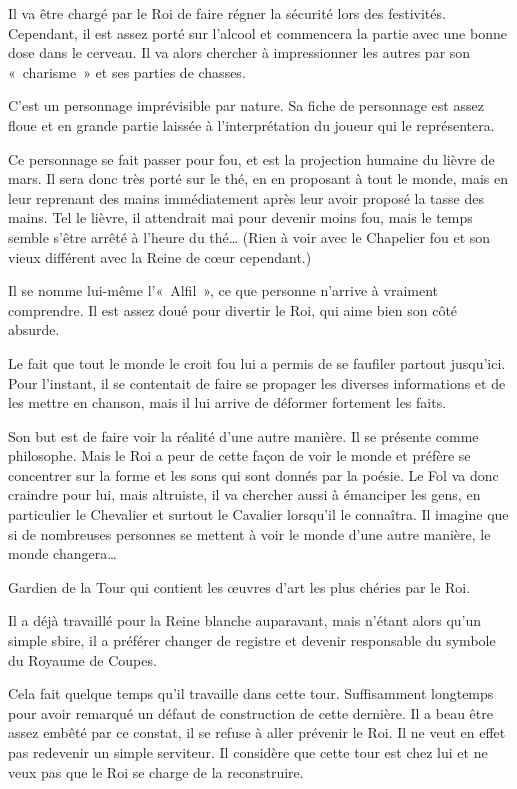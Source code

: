 {{Il va être chargé par le Roi de faire régner la sécurité lors des festivités.
Cependant, il est assez porté sur l’alcool et commencera la partie avec une bonne dose dans le cerveau.
Il va alors chercher à impressionner les autres par son «~charisme~» et ses parties de chasses.
}

{
C’est un personnage imprévisible par nature.
Sa fiche de personnage est assez floue et en grande partie laissée à l’interprétation du joueur qui le représentera.

Ce personnage se fait passer pour fou, et est la projection humaine du lièvre de mars.
Il sera donc très porté sur le thé, en en proposant à tout le monde, mais en leur reprenant des mains immédiatement après leur avoir proposé la tasse des mains.
Tel le lièvre, il attendrait mai pour devenir moins fou, mais le temps semble s’être arrêté à l’heure du thé…  (Rien à voir avec le Chapelier fou et son vieux différent avec la Reine de cœur cependant.)

Il se nomme lui-même l’«~Alfil~», ce que personne n’arrive à vraiment comprendre.
Il est assez doué pour divertir le Roi, qui aime bien son côté absurde.

Le fait que tout le monde le croit fou lui a permis de se faufiler partout jusqu’ici.
Pour l’instant, il se contentait de faire se propager les diverses informations et de les mettre en chanson, mais il lui arrive de déformer fortement les faits.

Son but est de faire voir la réalité d’une autre manière.  Il se présente comme philosophe.
Mais le Roi a peur de cette façon de voir le monde et préfère se concentrer sur la forme et les sons qui sont donnés par la poésie.
Le Fol va donc craindre pour lui, mais altruiste, il va chercher aussi à émanciper les gens, en particulier le Chevalier et surtout le Cavalier lorsqu’il le connaîtra.
Il imagine que si de nombreuses personnes se mettent à voir le monde d’une autre manière, le monde changera…
}

{
Gardien de la Tour qui contient les œuvres d’art les plus chéries par le Roi.

Il a déjà travaillé pour la Reine blanche auparavant, mais n’étant alors qu’un simple sbire, il a préférer changer de registre et devenir responsable du symbole du Royaume de Coupes.

Cela fait quelque temps qu’il travaille dans cette tour.  Suffisamment longtemps pour avoir remarqué un défaut de construction de cette dernière.
Il a beau être assez embêté par ce constat, il se refuse à aller prévenir le Roi.
Il ne veut en effet pas redevenir un simple serviteur.
Il considère que cette tour est chez lui et ne veux pas que le Roi se charge de la reconstruire.

}}
